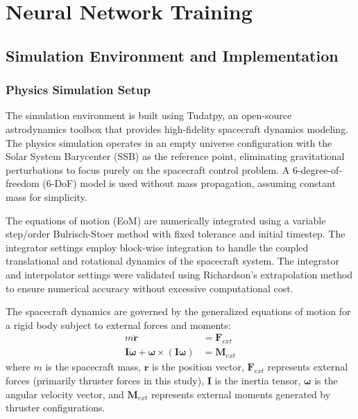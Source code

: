 \chapter{Neural Network Training}

\section{Simulation Environment and Implementation}

\subsection{Physics Simulation Setup}

The simulation environment is built using Tudatpy, an open-source astrodynamics
toolbox that provides high-fidelity spacecraft dynamics modeling. The physics
simulation operates in an empty universe configuration with the Solar System
Barycenter (SSB) as the reference point, eliminating gravitational
perturbations to focus purely on the spacecraft control problem. A
6-degree-of-freedom (6-DoF) model is used without mass propagation, assuming
constant mass for simplicity.

The equations of motion (EoM) are numerically integrated using a variable
step/order Bulrisch-Stoer method \autocite{bulirsch1966numerical} with fixed
tolerance and initial timestep. The integrator settings employ block-wise
integration to handle the coupled translational and rotational dynamics of the
spacecraft system. The integrator and interpolator settings were validated using Richardson's extrapolation method to ensure numerical accuracy without excessive computational cost.

The spacecraft dynamics are governed by the generalized equations of motion for
a rigid body subject to external forces and moments:
\begin{align}
    m\ddot{\mathbf{r}}                                                                               & = \mathbf{F}_{ext} \label{eq:translational_eom}  \\
    \mathbf{I}\boldsymbol{\dot{\omega}} + \boldsymbol{\omega} \times (\mathbf{I}\boldsymbol{\omega}) & = \boldsymbol{M}_{ext} \label{eq:rotational_eom}
\end{align}
where $m$ is the spacecraft mass, $\mathbf{r}$ is the position vector, $\mathbf{F}_{ext}$ represents external forces (primarily thruster forces in this study), $\mathbf{I}$ is the inertia tensor, $\boldsymbol{\omega}$ is the angular velocity vector, and $\boldsymbol{M}_{ext}$ represents external moments generated by thruster configurations.


